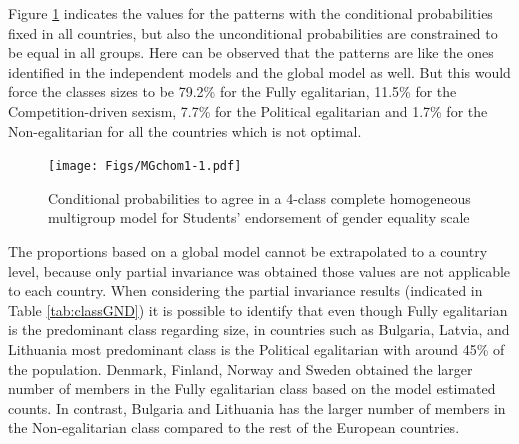 \documentclass[12pt,a4paper,oneside]{reedthesis}
\begin{document}
Figure \ref{fig:MGchom1} indicates the values for the patterns with the conditional probabilities fixed in all countries, but also the unconditional probabilities are constrained to be equal in all groups. Here can be observed that the patterns are like the ones identified in the independent models and the global model as well. But this would force the classes sizes to be 79.2\% for the Fully egalitarian, 11.5\% for the Competition-driven sexism, 7.7\% for the Political egalitarian and 1.7\% for the Non-egalitarian for all the countries which is not optimal.
\begin{figure}
\centering
\texttt{[image: Figs/MGchom1-1.pdf]}
\caption{\label{fig:MGchom1}Conditional probabilities to agree in a 4-class complete homogeneous multigroup model for Students' endorsement of gender equality scale}
\end{figure}
The proportions based on a global model cannot be extrapolated to a country level, because only partial invariance was obtained those values are not applicable to each country. When considering the partial invariance results (indicated in Table \ref{tab:classGND}) it is possible to identify that even though Fully egalitarian is the predominant class regarding size, in countries such as Bulgaria, Latvia, and Lithuania most predominant class is the Political egalitarian with around 45\% of the population. Denmark, Finland, Norway and Sweden obtained the larger number of members in the Fully egalitarian class based on the model estimated counts. In contrast, Bulgaria and Lithuania has the larger number of members in the Non-egalitarian class compared to the rest of the European countries.
\end{document}
